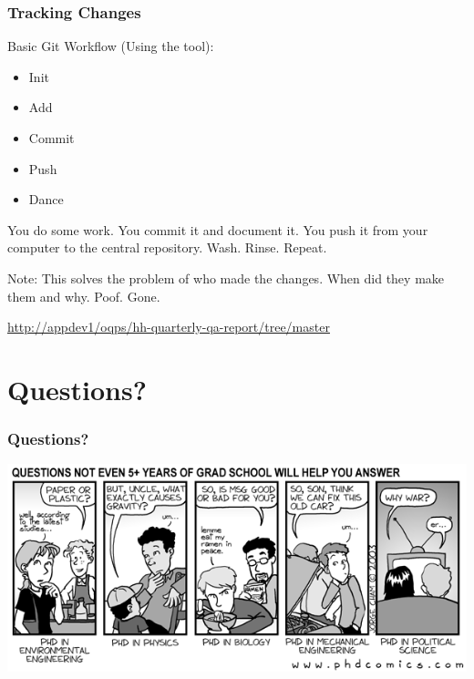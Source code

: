 \documentclass{beamer}
\begin{document}
\begin{frame} %
  \frametitle{Tracking Changes}
 
  Basic Git Workflow (Using the tool):
  \bigskip
 
  \begin{itemize}
  \item Init
  \item Add
  \item Commit
  \item Push
  \item Dance
  \end{itemize}
 
  \bigskip
  You do some work. You commit it and document it. You push it from
  your computer to the central repository. Wash. Rinse. Repeat.
 
  Note: This solves the problem of who made the changes. When did they make
  them and why. Poof. Gone.
  
  {\tiny {\url{http://appdev1/oqps/hh-quarterly-qa-report/tree/master}}}
  
\end{frame}


\section{Questions?} %

\begin{frame} %
 \frametitle{Questions?}
 \includegraphics[width=\textwidth]{./img/questions.png}
\end{frame}
\end{document}
